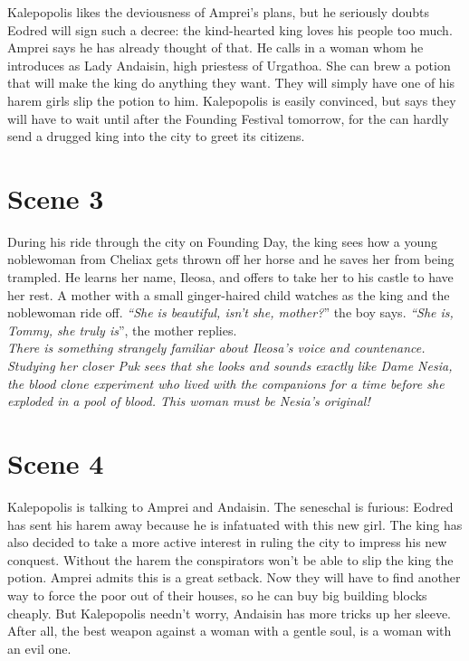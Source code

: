 Kalepopolis likes the deviousness of Amprei's plans, but he seriously doubts Eodred will sign such a decree: the kind-hearted king loves his people too much. Amprei says he has already thought of that. He calls in a woman whom he introduces as Lady Andaisin, high priestess of Urgathoa. She can brew a potion that will make the king do anything they want. They will simply have one of his harem girls slip the potion to him. Kalepopolis is easily convinced, but says they will have to wait until after the Founding Festival tomorrow, for the can hardly send a drugged king into the city to greet its citizens.\\

\section{Scene 3}

During his ride through the city on Founding Day, the king sees how a young noblewoman from Cheliax gets thrown off her horse and he saves her from being trampled. He learns her name, Ileosa, and offers to take her to his castle to have her rest. A mother with a small ginger-haired child watches as the king and the noblewoman ride off. {\itshape``She is beautiful, isn't she, mother?}'' the boy says. {\itshape``She is, Tommy, she truly is}'', the mother replies.\\

 {\itshape There is something strangely familiar about Ileosa's voice and countenance. Studying her closer Puk sees that she looks and sounds exactly like Dame Nesia, the blood clone experiment who lived with the companions for a time before she exploded in a pool of blood. This woman must be Nesia's original!}  \section{Scene 4}

Kalepopolis is talking to Amprei and Andaisin. The seneschal is furious: Eodred has sent his harem away because he is infatuated with this new girl. The king has also decided to take a more active interest in ruling the city to impress his new conquest. Without the harem the conspirators won't be able to slip the king the potion. Amprei admits this is a great setback. Now they will have to find another way to force the poor out of their houses, so he can buy big building blocks cheaply. But Kalepopolis needn't worry, Andaisin has more tricks up her sleeve. After all, the best weapon against a woman with a gentle soul, is a woman with an evil one.\\

